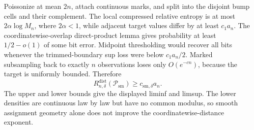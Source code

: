 Poissonize at mean \(2n\), attach continuous marks, and split into the disjoint bump cells and their complement.  The local compressed relative entropy is at most \(2\alpha\log M_n\), where \(2\alpha<1\), while adjacent target values differ by at least \(c_1a_n\).  The coordinatewise-overlap direct-product lemma gives probability at least \(1/2-o(1)\) of some bit error.  Midpoint thresholding would recover all bits whenever the trimmed-boundary sup loss were below \(c_1a_n/2\).  Marked subsampling back to exactly \(n\) observations loses only \(O(e^{-cn})\), because the target is uniformly bounded.  Therefore
\[
 R_{n,\delta}^{\mathrm{dist}}(\mathcal P_{\mathrm{sm}})
 \geq c_{\mathrm{sm},\delta}a_n.
\]
The upper and lower bounds give the displayed liminf and limsup.  The lower densities are continuous law by law but have no common modulus, so smooth assignment geometry alone does not improve the coordinatewise-distance exponent.